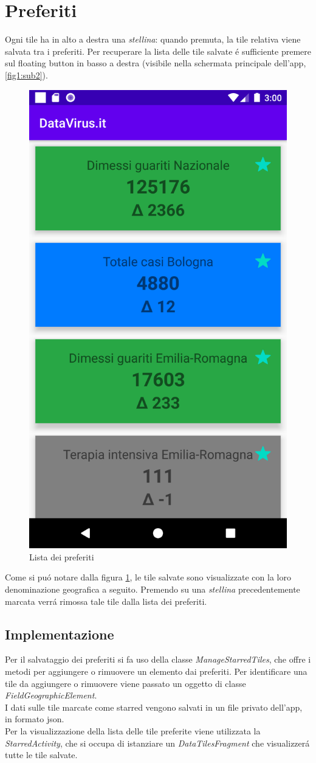 \documentclass{article}
\begin{document}
    \section{Preferiti}
    Ogni tile ha in alto a destra una \emph{stellina}: quando premuta, la tile relativa viene salvata tra i preferiti.
    Per recuperare la lista delle tile salvate é sufficiente premere sul floating button in basso a destra (visibile nella schermata principale dell'app, \ref{fig1:sub2}).

    \begin{figure}[h]
        \centering
        \includegraphics[width=.5\linewidth]{preferences.png}
        \caption{Lista dei preferiti}
        \label{fig4}
    \end{figure}

    Come si puó notare dalla figura \ref{fig4}, le tile salvate sono visualizzate con la loro denominazione geografica a seguito.
    Premendo su una \emph{stellina} precedentemente marcata verrá rimossa tale tile dalla lista dei preferiti.

    \subsection{Implementazione}
    Per il salvataggio dei preferiti si fa uso della classe \emph{ManageStarredTiles}, che offre i metodi per aggiungere o rimuovere un elemento dai preferiti. Per identificare una tile da aggiungere o rimuovere viene passato un oggetto di classe \emph{FieldGeographicElement}.
    \\
    I dati sulle tile marcate come starred vengono salvati in un file privato dell'app, in formato json.
    \\
    Per la visualizzazione della lista delle tile preferite viene utilizzata la \emph{StarredActivity}, che si occupa di istanziare un \emph{DataTilesFragment} che visualizzerá tutte le tile salvate.
\end{document}
